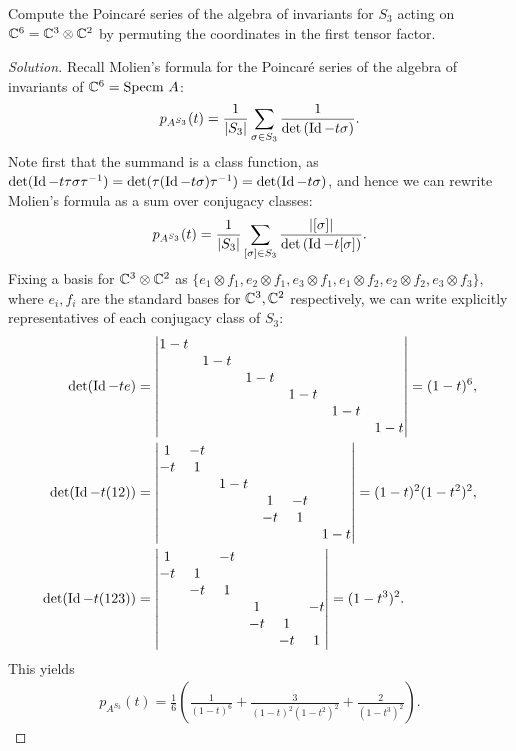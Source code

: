 \documentclass{../../mathnotes}
\begin{document}
\begin{exc}
    Compute the Poincar\'e series of the algebra of invariants for $S_3$ acting
    on $\mathbb{C}^6=\mathbb{C}^3\otimes\mathbb{C}^2$ by permuting the coordinates in the first tensor factor.
\end{exc}
\begin{proof}[Solution]
    Recall Molien's formula for the Poincar\'e series of the algebra of invariants of $\mathbb{C}^6=\text{Specm }A$:
    \[p_{A^{S_3}}(t)=\frac{1}{|S_3|}\sum_{\sigma\in S_3}\frac{1}{\det\left( \operatorname{Id}-t\sigma \right)}.\]
    Note first that the summand is a class function, as $\det(\operatorname{Id}-t\tau\sigma\tau^{-1})=\det(\tau(\operatorname{Id}-t\sigma)\tau^{-1})=\det(\operatorname{Id}-t\sigma)$,
    and hence we can rewrite Molien's formula as a sum over conjugacy classes:
    \[p_{A^{S_3}}(t)=\frac{1}{|S_3|}\sum_{[\sigma]\in S_3}\frac{|[\sigma]|}{\det\left(\operatorname{Id}-t[\sigma] \right)}.\]
    Fixing a basis for $\mathbb{C}^3\otimes\mathbb{C}^2$ as $\{e_1\otimes f_1,e_2\otimes f_1,e_3\otimes f_1,e_1\otimes f_2,e_2\otimes f_2,e_3\otimes f_3\}$,
    where $e_i,f_i$ are the standard bases for $\mathbb{C}^3,\mathbb{C}^2$ respectively, we can write explicitly representatives of each
    conjugacy class of $S_3$:
    \begin{align*}
        \det(\operatorname{Id}-te) &=
        \begin{vmatrix}
            1-t\\ & 1-t\\ &&1-t\\&&&1-t\\&&&&1-t\\&&&&&1-t
        \end{vmatrix}
        =(1-t)^6,\\
        \det(\operatorname{Id}-t(12)) &=
        \begin{vmatrix}
            1&-t\\ -t& 1\\ &&1-t\\&&&1&-t\\&&&-t&1\\&&&&&1-t
        \end{vmatrix}
        =(1-t)^2(1-t^2)^2,\\
        \det(\operatorname{Id}-t(123)) &=
        \begin{vmatrix}
            1&&-t\\ -t& 1\\ &-t&1\\&&&1&&-t\\&&&-t&1\\&&&&-t&1
        \end{vmatrix}
        =(1-t^3)^2.
    \end{align*}
    This yields
    \begin{align*}
        p_{A^{S_3}}(t)=\frac{1}{6}\left( \frac{1}{(1-t)^6}+\frac{3}{(1-t)^2(1-t^2)^2}+\frac{2}{(1-t^3)^2} \right).
    \end{align*}
\end{proof}
\end{document}
